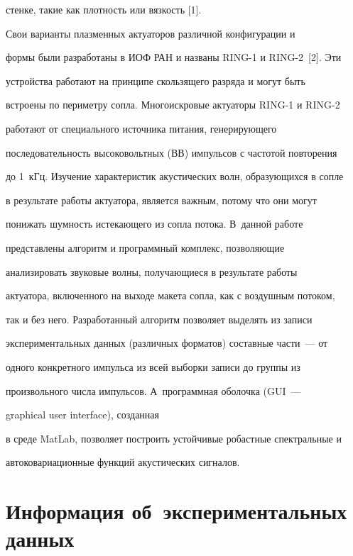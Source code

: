 стенке, такие как плотность или вязкость [1].


     


     Свои варианты плазменных актуаторов различной конфигурации и 


формы были разработаны в ИОФ РАН и названы RING-1 и RING-2~[2]. Эти 


устройства работают на принципе скользящего разряда и могут быть 


встроены по периметру сопла. Многоискровые актуаторы RING-1 и RING-2 


работают от специального источника питания, генерирующего 


последовательность высоковольтных (ВВ) импульсов с частотой повторения 


до 1~кГц. Изучение характеристик акустических волн, образующихся в сопле 


в результате работы актуатора, является важным, потому что они могут 


понижать шумность истекающего из сопла потока. В~данной работе


представлены алгоритм и программный комплекс, позволяющие 


анализировать звуковые волны, получающиеся в результате работы 


актуатора, включенного на выходе макета сопла, как с воздушным потоком, 


так и без него. Разработанный алгоритм позволяет выделять из записи 


экспериментальных данных (различных форматов) составные части~--- от 


одного конкретного импульса из всей выборки записи до группы из 


произвольного числа импульсов. А~про\-грам\-мная оболочка (GUI~---


graphical user interface), созданная 


в среде MatLab, позволяет построить устойчивые робастные спектральные и 


автоковариационные функций акустических сигналов.


  


    \section{Информация об~экспериментальных данных}


     


